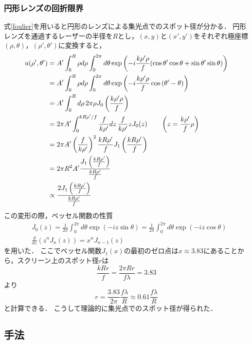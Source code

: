 \documentclass[titlepage]{jsarticle}
\begin{document}
\subsubsection{円形レンズの回折限界}
式\eqref{foulier}を用いると円形のレンズによる集光点でのスポット径が分かる．
円形レンズを通過するレーザーの半径を$R$とし，$(x,y)$と$(x',y')$をそれぞれ極座標$(\rho,\theta)$，$(\rho',\theta')$に変換すると，
\begin{align}
    u(\rho',\theta') &= A'\int_0^R \rho d\rho \int_0^{2\pi} d\theta \exp{\left(-i\frac{k\rho'\rho}{f}(\cos{\theta'}\cos{\theta}+\sin{\theta'}\sin{\theta})\right)} \notag\\
    &= A' \int_0^R \rho d\rho \int_0^{2\pi} d\theta \exp{\left(-i\frac{k\rho'\rho}{f}\cos{(\theta'-\theta)}\right)} \notag\\
    &= A' \int_0^R d\rho \,2\pi\rho J_0\left(\frac{k\rho'\rho}{f}\right) \notag\\
    &= 2\pi A' \int_0^{kR\rho'/f} \frac{f}{k\rho'}dz \, \frac{f}{k\rho'}z J_0(z) \qquad \left(z = \frac{k\rho'}{f}\rho \right)\notag\\
    &= 2\pi A' \left(\frac{f}{k\rho'}\right)^2 \frac{kR\rho'}{f} J_1\left(\frac{kR\rho'}{f}\right) \notag\\
    &= 2\pi R^2 A' \frac{J_1\left(\frac{kR\rho'}{f}\right)}{\frac{kR\rho'}{f}} \notag\\
    &\propto \frac{2J_1\left(\frac{kR\rho'}{f}\right)}{\frac{kR\rho'}{f}} \label{bessel}
\end{align}
この変形の際，ベッセル関数の性質
\begin{align}
    &J_0(z) = \frac{1}{2\pi} \int_0^{2\pi} d\theta \exp{(-iz\sin{\theta})} = \frac{1}{2\pi} \int_0^{2\pi} d\theta \exp{(-iz\cos{\theta})} \\
    &\frac{d}{dz}(z^n J_n(z)) = x^n J_{n-1} (z)
\end{align}
を用いた．
ここでベッセル関数$J_1(x)$の最初のゼロ点は$x\approx3.83$にあることから，スクリーン上のスポット径$r$は
\begin{equation}
    \frac{kRr}{f} = \frac{2\pi Rr}{f\lambda} = 3.83
\end{equation}
より
\begin{equation}
    r = \frac{3.83}{2\pi} \frac{f\lambda}{R} \approx 0.61\frac{f\lambda}{R} \label{limit}
\end{equation}
と計算できる．
こうして理論的に集光点でのスポット径が得られた．

\subsection{手法}
\end{document}
